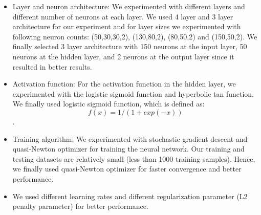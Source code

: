 \begin{itemize}
\item Layer and neuron architecture: We experimented with different layers and different number of neurons at each layer.
We used 4 layer and 3 layer architecture for our experiment and for layer sizes we experimented with following neuron counts: (50,30,30,2), (130,80,2), (80,50,2) and (150,50,2). 
We finally selected 3 layer architecture with 150 neurons at the input layer, 50 neurons at the hidden layer, and 2 neurons at the output layer since it resulted in better results.
\item Activation function: For the activation function in the hidden layer, we experimented with the logistic sigmoid function and hyperbolic tan function.
We finally used logistic sigmoid function, which is defined as:
 $$f(x)= 1/(1+exp(-x))$$.
\item Training algorithm: We experimented with stochastic gradient descent and quasi-Newton optimizer for training the neural network. 
Our training and testing datasets are relatively small (less than 1000 training samples).
Hence, we finally used quasi-Newton optimizer for faster convergence and better performance.
\item We used different learning rates and different regularization parameter (L2 penalty parameter) for better performance.   
\end{itemize}



